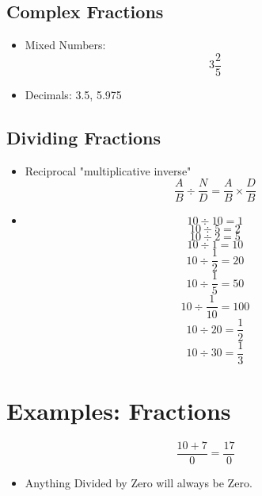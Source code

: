 \documentclass[]{article}
\begin{document}
\subsection{Complex Fractions}
\begin{itemize}
	\item Mixed Numbers:
	\begin{equation}
	3 \frac{2}{5}
	\end{equation}
	\item Decimals:  3.5, 5.975
\end{itemize}

\subsection{Dividing  Fractions}
\begin{itemize}
	\item Reciprocal "multiplicative inverse"
	\begin{equation}
		\frac{A}{B} \div \frac{N}{D}  =  \frac{A}{B} \times \frac{D}{B}		
	\end{equation}
	\item
		$$10 \div 10 = 1$$ 
		$$10 \div 5 = 2$$
		$$10 \div 2 = 5$$
		$$10 \div 1 = 10$$
		$$10 \div \frac{1}{2} = 20$$
		$$10 \div \frac{1}{5} = 50$$
		$$10 \div \frac{1}{10} = 100$$
		$$10 \div 20 = \frac{1}{2}$$
		$$10 \div 30 = \frac{1}{3}$$
		
\end{itemize}

\section{Examples: Fractions}
\begin{equation}
	\frac {10+7}{0} = \frac{17}{0}
\end{equation}
\begin{itemize}
	\item Anything Divided by Zero will always be Zero.
\end{itemize}
\end{document}
